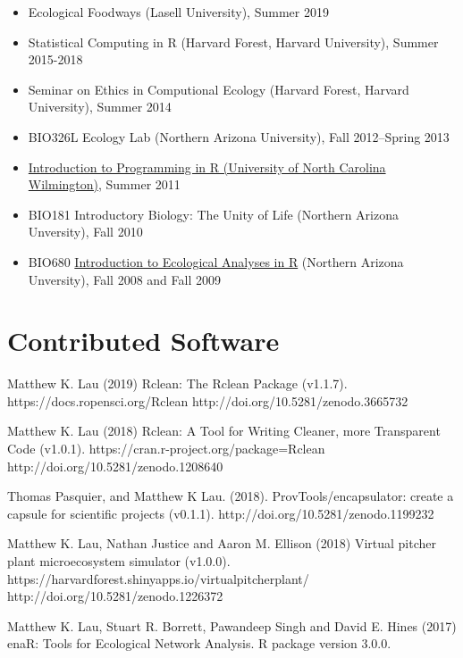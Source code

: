 \documentclass[a4paper]{article}
\begin{document}
\begin{itemize}
\item
  Ecological Foodways (Lasell University), Summer 2019
\item
  Statistical Computing in R (Harvard Forest, Harvard
  University), Summer 2015-2018
\item
  Seminar on Ethics in Computional Ecology (Harvard Forest, Harvard
  University), Summer 2014
\item
  BIO326L Ecology Lab (Northern Arizona University), Fall 2012--Spring
  2013
\item
  \href{http://people.uncw.edu/borretts/courses/RworkshopUNCW.pdf}{Introduction
  to Programming in R (University of North Carolina Wilmington)}, Summer
  2011
\item
  BIO181 Introductory Biology: The Unity of Life (Northern Arizona
  Unversity), Fall 2010
\item
  BIO680
  \href{http://www.mpcer.nau.edu/igert/eco_analysis_r.html}{Introduction
  to Ecological Analyses in R} (Northern Arizona Unversity), Fall 2008
  and Fall 2009
\end{itemize}

\section{Contributed Software}\label{contributed-software}


{Matthew K. Lau (2019) Rclean: The Rclean Package
  (v1.1.7). https://docs.ropensci.org/Rclean
  http://doi.org/10.5281/zenodo.3665732}

{Matthew K. Lau (2018) Rclean: A Tool for Writing Cleaner, more
  Transparent Code (v1.0.1). https://cran.r-project.org/package=Rclean
  http://doi.org/10.5281/zenodo.1208640}

{Thomas Pasquier, and Matthew K Lau. (2018). ProvTools/encapsulator:
  create a capsule for scientific projects
  (v0.1.1). http://doi.org/10.5281/zenodo.1199232}

{Matthew K. Lau, Nathan Justice and Aaron M. Ellison (2018) Virtual
  pitcher plant microecosystem simulator
  (v1.0.0). https://harvardforest.shinyapps.io/virtualpitcherplant/
  http://doi.org/10.5281/zenodo.1226372}

{Matthew K. Lau, Stuart R. Borrett, Pawandeep Singh and David E. Hines
  (2017) enaR: Tools for Ecological Network Analysis. R package
  version 3.0.0.}
\end{document}
